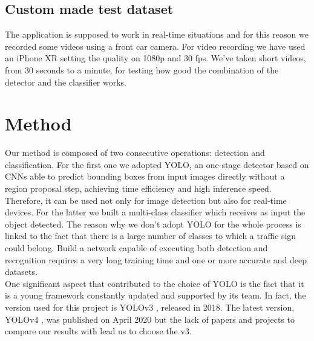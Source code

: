\documentclass[10pt,twocolumn,letterpaper]{article}
\begin{document}
\subsection{Custom made test dataset}
The application is supposed to work in real-time situations and for this reason we recorded some videos using a front car camera. For video recording we have used an iPhone XR setting the quality on 1080p and 30 fps. We've taken short videos, from 30 seconds to a minute, for testing how good the combination of the detector and the classifier works.
\section{Method}
Our method is composed of two consecutive operations: detection and classification. For the first one we adopted YOLO, an one-stage detector based on CNNs able to predict bounding boxes from input images directly without a region proposal step, achieving time efficiency and high inference speed. Therefore, it can be used not only for image detection but also for real-time devices. For the latter we built a multi-class classifier which receives as input the object detected. The reason why we don't adopt YOLO for the whole process is linked to the fact that there is a large number of classes to which a traffic sign could belong. Build a network capable of executing both detection and recognition requires a very long training time and one or more accurate and deep datasets.\\ 
One significant aspect that contributed to the choice of YOLO is the fact that it is a young framework constantly updated and supported by its team. In fact, the version used for this project is YOLOv3 \cite{yolov3}, released in 2018. The latest version, YOLOv4 \cite{yolov4}, was published on April 2020 but the lack of papers and projects to compare our results with lead us to choose the v3. 
\end{document}
